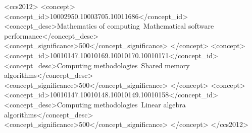\documentclass[sigconf, 10pt, screen]{acmart}
\begin{document}
\begin{CCSXML}
<ccs2012>
   <concept>
       <concept_id>10002950.10003705.10011686</concept_id>
       <concept_desc>Mathematics of computing~Mathematical software performance</concept_desc>
       <concept_significance>500</concept_significance>
       </concept>
   <concept>
       <concept_id>10010147.10010169.10010170.10010171</concept_id>
       <concept_desc>Computing methodologies~Shared memory algorithms</concept_desc>
       <concept_significance>500</concept_significance>
       </concept>
   <concept>
       <concept_id>10010147.10010148.10010149.10010158</concept_id>
       <concept_desc>Computing methodologies~Linear algebra algorithms</concept_desc>
       <concept_significance>500</concept_significance>
       </concept>
 </ccs2012>
\end{CCSXML}





\maketitle










\end{document}
